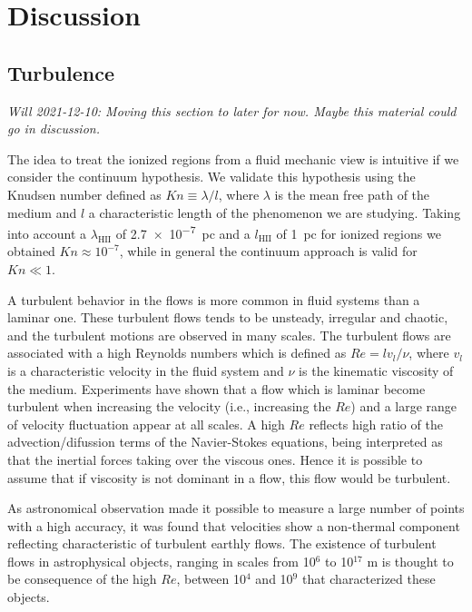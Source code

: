 \documentclass[fleqn,usenatbib, useAMS, a4paper]{mnras}
\begin{document}



\section{Discussion}\label{sec:discussion}

\subsection{Turbulence}

\textit{Will 2021-12-10: Moving this section to later for now. Maybe
  this material could go in discussion.}

The idea to treat the ionized regions from a fluid mechanic view is intuitive if we consider the continuum hypothesis. 
We validate this hypothesis using the Knudsen number defined as \(Kn \equiv \lambda / l\), where \(\lambda\) is the mean free path of the medium and \(l\) a characteristic length of the phenomenon we are studying.
Taking into account a \(\lambda_{\text{HII}}\) of \SI{2.7e-7}{pc} \citep{1941ApJ....93..369S} and a \(l_{\text{HII}}\) of \SI{1}{pc} for ionized regions we obtained \(Kn \approx 10^{-7}\), while in general the continuum approach is valid for \(Kn \ll 1\).

A turbulent behavior in the flows is more common in fluid systems than a laminar one.
These turbulent flows tends to be unsteady, irregular and chaotic, and the turbulent motions are observed in many scales. 
The turbulent flows are associated with a high Reynolds numbers which is defined as \(Re = l v_{l} / \nu \), where \(v_{l}\) is a characteristic velocity in the fluid system and \(\nu\) is the kinematic viscosity of the medium.
Experiments have shown that a flow which is laminar become turbulent when increasing the velocity (i.e., increasing the \(Re\)) and a large range of velocity fluctuation appear at all scales.
A high \(Re\) reflects high ratio of the advection/difussion terms of the Navier-Stokes equations, being interpreted as that the inertial forces taking over the viscous ones. 
Hence it is possible to assume that if viscosity is not dominant in a flow, this flow would be turbulent.

As astronomical observation made it possible to measure a large number of points with a high accuracy, it was found that velocities show a non-thermal component reflecting characteristic of turbulent earthly flows.
The existence of turbulent flows in astrophysical objects, ranging in scales from 10\(^6\) to 10\(^{17}\) m \citep{2010ApJ...710..853C} is thought to be consequence of the high \(Re\), between 10\(^4\) and 10\(^9\) \citep{1949ApJ...110..329C,lagrois2011} that characterized these objects.
\end{document}
